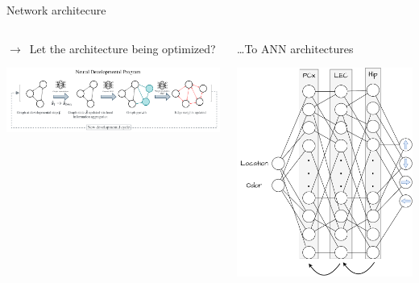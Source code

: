 \documentclass[bigger]{beamer}
\begin{document}
\begin{frame}[label={sec:orga3aebd3}]{Network architecure}
\begin{columns}
\begin{column}{0.5\columnwidth}
\begin{center}
    $\rightarrow$~Let the architecture being optimized?
\end{center}
\begin{center}
\includegraphics[width=\textwidth]{img/neural-dev-program.png}
\end{center}
\end{column}
\begin{column}{0.5\columnwidth}
\begin{center}
    \dots{}To ANN architectures
\end{center}
\begin{center}
\includegraphics[height=0.4\textheight]{img/nn-architecture-fully-connected.drawio.pdf}

\end{center}
\end{column}
\end{columns}
\end{frame}
\end{document}
